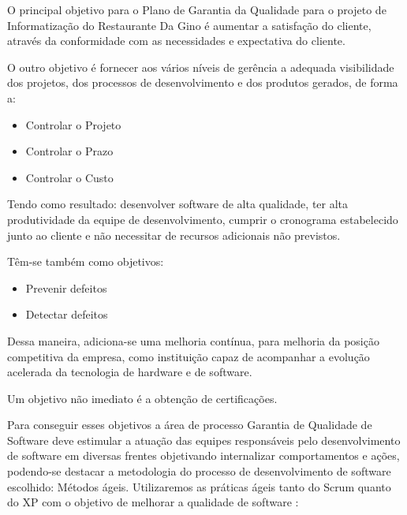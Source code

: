 O principal objetivo para o Plano de Garantia da Qualidade para o projeto de Informatização do Restaurante Da Gino é aumentar a satisfação do cliente, através da conformidade com as necessidades e expectativa do cliente.

O outro objetivo é fornecer aos vários níveis de gerência a adequada visibilidade dos projetos, dos processos de desenvolvimento e dos produtos gerados, de forma a:

\begin{itemize}
\item Controlar o Projeto
\item Controlar o Prazo
\item Controlar o Custo
\end{itemize}

Tendo como resultado: desenvolver software de alta qualidade, ter alta produtividade da equipe de desenvolvimento, cumprir o cronograma estabelecido junto ao cliente e não necessitar de recursos adicionais não previstos.

Têm-se também como objetivos:

\begin{itemize}
  \item Prevenir defeitos
  \item Detectar defeitos
\end{itemize}

Dessa maneira, adiciona-se uma melhoria contínua, para melhoria da posição competitiva da empresa, como instituição capaz de acompanhar a evolução acelerada da tecnologia de hardware e de software.

Um objetivo não imediato é a obtenção de certificações.

Para conseguir esses objetivos a área de processo Garantia de Qualidade de Software deve estimular a atuação das equipes responsáveis pelo desenvolvimento de software em diversas frentes objetivando internalizar comportamentos e ações, podendo-se destacar a metodologia do processo de desenvolvimento de software escolhido: Métodos ágeis. Utilizaremos as práticas ágeis tanto do Scrum quanto do XP com o objetivo de melhorar a qualidade de software \cite{BecAnd04extreme}:

